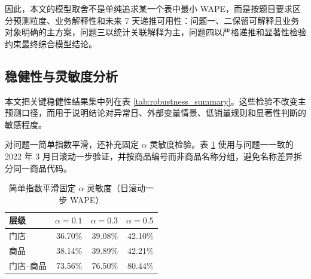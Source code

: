 因此，本文的模型取舍不是单纯追求某一个表中最小 WAPE，而是按题目要求区分预测粒度、业务解释性和未来 7 天递推可用性：问题一、二保留可解释且业务对象明确的主方案，问题三以统计关联解释为主，问题四以严格递推和显著性检验约束最终综合模型结论。

\subsection{稳健性与灵敏度分析}

本文把关键稳健性结果集中列在表 \ref{tab:robustness_summary}。这些检验不改变主预测口径，而用于说明结论对异常日、外部变量情景、低销量规则和显著性判断的敏感程度。

\begin{table}[H]
\centering
\caption{稳健性检查汇总}
\label{tab:robustness_summary}
\end{table}

对问题一简单指数平滑，还补充固定 $\alpha$ 灵敏度检验。表 \ref{tab:alpha_sensitivity} 使用与问题一一致的 2022 年 3 月日滚动一步验证，并按商品编号而非商品名称分组，避免名称差异拆分同一商品代码。

\begin{table}[H]
\centering
\caption{简单指数平滑固定 $\alpha$ 灵敏度（日滚动一步 WAPE）}
\label{tab:alpha_sensitivity}
\begin{tabular}{lrrr}
\toprule
层级 & $\alpha=0.1$ & $\alpha=0.3$ & $\alpha=0.5$ \\
\midrule
门店 & 36.70\% & 39.08\% & 42.10\% \\
商品 & 38.14\% & 39.89\% & 42.21\% \\
门店--商品 & 73.56\% & 76.50\% & 80.44\% \\
\bottomrule
\end{tabular}
\end{table}

